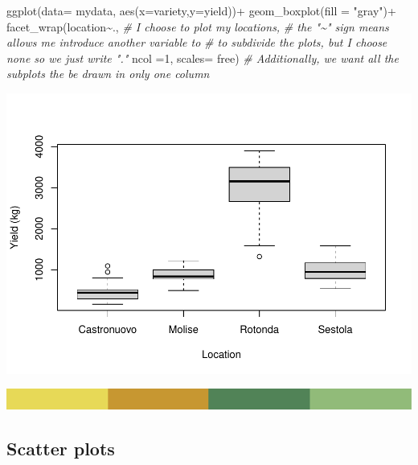 \documentclass[
]{book}
\newenvironment{Shaded}{\begin{snugshade}}{\end{snugshade}}
\newcommand{\AttributeTok}[1]{\textcolor[rgb]{0.77,0.63,0.00}{#1}}
\newcommand{\CommentTok}[1]{\textcolor[rgb]{0.56,0.35,0.01}{\textit{#1}}}
\newcommand{\DecValTok}[1]{\textcolor[rgb]{0.00,0.00,0.81}{#1}}
\newcommand{\FunctionTok}[1]{\textcolor[rgb]{0.00,0.00,0.00}{#1}}
\newcommand{\NormalTok}[1]{#1}
\newcommand{\SpecialCharTok}[1]{\textcolor[rgb]{0.00,0.00,0.00}{#1}}
\newcommand{\StringTok}[1]{\textcolor[rgb]{0.31,0.60,0.02}{#1}}
\begin{document}
\begin{Shaded}
\begin{Highlighting}[]
\FunctionTok{ggplot}\NormalTok{(}\AttributeTok{data=}\NormalTok{ mydata,  }\FunctionTok{aes}\NormalTok{(}\AttributeTok{x=}\NormalTok{variety,}\AttributeTok{y=}\NormalTok{yield))}\SpecialCharTok{+} 
  \FunctionTok{geom\_boxplot}\NormalTok{(}\AttributeTok{fill =} \StringTok{"gray"}\NormalTok{)}\SpecialCharTok{+} 
  \FunctionTok{facet\_wrap}\NormalTok{(location}\SpecialCharTok{\textasciitilde{}}\NormalTok{., }\CommentTok{\# I choose to plot my locations, }
                         \CommentTok{\# the "\textasciitilde{}" sign means allows me introduce another variable to }
                         \CommentTok{\# to subdivide the plots, but I choose none so we just write "."}
             \AttributeTok{ncol =}\DecValTok{1}\NormalTok{,}
             \AttributeTok{scales=} \StringTok{\textquotesingle{}free\textquotesingle{}}\NormalTok{)    }\CommentTok{\# Additionally, we want all the subplots the be drawn in only one column}
\end{Highlighting}
\end{Shaded}

\includegraphics[width=1.5\linewidth]{PPB-Toolkit-for-R-and-R-Studio_files/figure-latex/unnamed-chunk-63-1}

\includegraphics{rsrstrip.png}

\hypertarget{scatter-plots}{%
\subsection{Scatter plots}\label{scatter-plots}}
\end{document}
